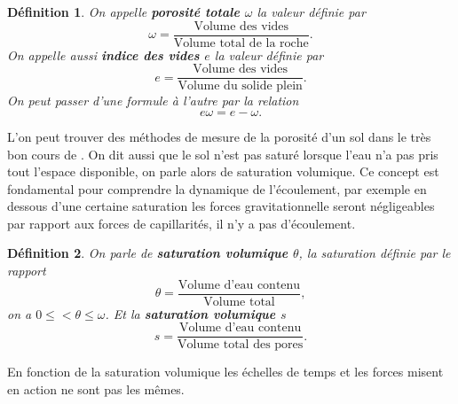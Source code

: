 \documentclass[a4paper,11pt]{article}
\numberwithin{equation}{section}
\newtheorem{definition}{Définition}
\begin{document}
\begin{definition}
	\label{def:porosite}
	On appelle \textbf{porosité totale $\omega$} la valeur définie par
	\begin{equation}
		\omega =\frac{\textrm{Volume des vides}}{\textrm{Volume total de la roche}}.
	\end{equation}
	On appelle aussi \textbf{indice des vides $e$} la valeur définie par 
	\begin{equation}
		e=\frac{\textrm{Volume des vides}}{\textrm{Volume du solide plein}}.
	\end{equation}
	On peut passer d'une formule à l'autre par la relation 
	\[e\omega=e-\omega.\]
\end{definition}
L'on peut trouver des méthodes de mesure de la porosité d'un sol dans le très bon cours de \cite{marsily_de1986quantitative}. On dit aussi que le sol n'est pas saturé lorsque l'eau n'a pas pris tout l'espace disponible, on parle alors de saturation volumique. Ce concept est fondamental pour comprendre la dynamique de l'écoulement, par exemple en dessous d'une certaine saturation les forces gravitationnelle seront négligeables par rapport aux forces de capillarités, il n'y a pas d'écoulement.
 
\begin{definition}
	\label{def:saturation}
	On parle de \textbf{saturation volumique $\theta$}, la saturation définie par le rapport
	\begin{equation}
		\theta= \frac{\textrm{Volume d'eau contenu}}{\textrm{Volume total}},
	\end{equation}
	on a $0\leq<\theta\leq \omega$. Et la \textbf{saturation volumique $s$}
	\begin{equation}
		s=\frac{\textrm{Volume d'eau contenu}}{\textrm{Volume total des pores}}.
	\end{equation}
\end{definition}

En fonction de la saturation volumique les échelles de temps et les forces misent en action ne sont pas les mêmes.
\end{document}
